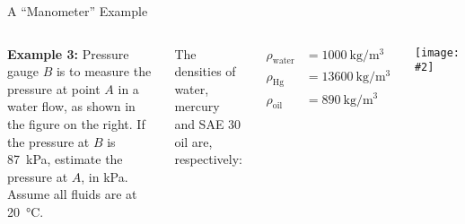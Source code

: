 \documentclass[12pt,aspectratio=169]{beamer}
\newcommand{\pic}[2]{\texttt{[image: \#2]}}
\begin{document}
\begin{frame}{A ``Manometer'' Example}
  \begin{columns}

    \textbf{Example 3:} Pressure gauge $B$ is to measure the pressure at point
    $A$ in a water flow, as shown in the figure on the right. If the pressure at
    $B$ is \SI{87}{\kilo\pascal}, estimate the pressure at $A$, in
    \si{\kilo\pascal}. Assume all fluids are at \SI{20}{\celsius}.

    \vspace{.1in}The densities of water, mercury and SAE 30 oil are,
    respectively:

    \vspace{-.3in}
    \begin{align*}
      \rho_\mathrm{water}&=\SI{1000}{\kilo\gram\per\metre^3}\\
      \rho_\mathrm{Hg}&=\SI{13600}{\kilo\gram\per\metre^3}\\
      \rho_\mathrm{oil}&=\SI{890}{\kilo\gram\per\metre^3}
    \end{align*}
    
    \pic{1}{mano.jpg}
  \end{columns}
\end{frame}



%
%    
\end{document}
